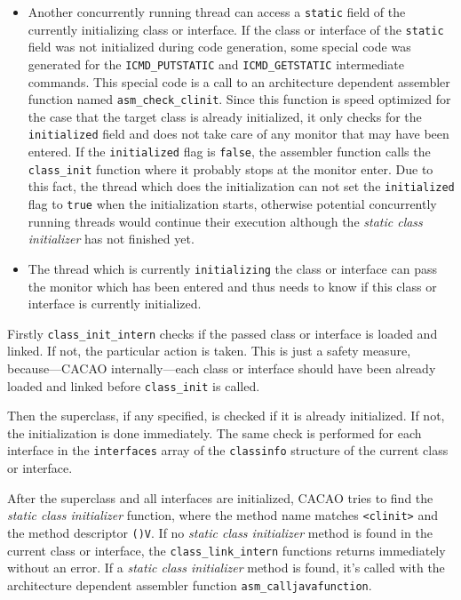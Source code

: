 \begin{itemize}
 \item Another concurrently running thread can access a
 \texttt{static} field of the currently initializing class or
 interface. If the class or interface of the \texttt{static} field was
 not initialized during code generation, some special code was
 generated for the \texttt{ICMD\_PUTSTATIC} and
 \texttt{ICMD\_GETSTATIC} intermediate commands. This special code is
 a call to an architecture dependent assembler function named
 \texttt{asm\_check\_clinit}. Since this function is speed optimized
 for the case that the target class is already initialized, it only
 checks for the \texttt{initialized} field and does not take care of
 any monitor that may have been entered. If the \texttt{initialized}
 flag is \texttt{false}, the assembler function calls the
 \texttt{class\_init} function where it probably stops at the monitor
 enter. Due to this fact, the thread which does the initialization can
 not set the \texttt{initialized} flag to \texttt{true} when the
 initialization starts, otherwise potential concurrently running
 threads would continue their execution although the \textit{static
 class initializer} has not finished yet.

 \item The thread which is currently \texttt{initializing} the class
 or interface can pass the monitor which has been entered and thus
 needs to know if this class or interface is currently initialized.
\end{itemize}

Firstly \texttt{class\_init\_intern} checks if the passed class or
interface is loaded and linked. If not, the particular action is
taken. This is just a safety measure, because---CACAO
internally---each class or interface should have been already loaded
and linked before \texttt{class\_init} is called.

Then the superclass, if any specified, is checked if it is already
initialized. If not, the initialization is done immediately. The same
check is performed for each interface in the \texttt{interfaces} array
of the \texttt{classinfo} structure of the current class or interface.

After the superclass and all interfaces are initialized, CACAO tries
to find the \textit{static class initializer} function, where the
method name matches \texttt{<clinit>} and the method descriptor
\texttt{()V}. If no \textit{static class initializer} method is found in the
current class or interface, the \texttt{class\_link\_intern} functions
returns immediately without an error. If a \textit{static class
initializer} method is found, it's called with the architecture
dependent assembler function \texttt{asm\_calljavafunction}.

